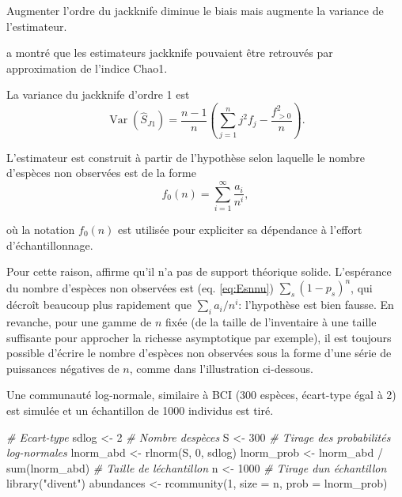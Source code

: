 \documentclass[
  11pt,
  american,
  a4paper,
  extrafontsizes,onecolumn,openright
  ]{memoir}
\newenvironment{Shaded}{\begin{snugshade}}{\end{snugshade}}
\newcommand{\AttributeTok}[1]{\textcolor[rgb]{0.77,0.63,0.00}{#1}}
\newcommand{\CommentTok}[1]{\textcolor[rgb]{0.56,0.35,0.01}{\textit{#1}}}
\newcommand{\DecValTok}[1]{\textcolor[rgb]{0.00,0.00,0.81}{#1}}
\newcommand{\FunctionTok}[1]{\textcolor[rgb]{0.00,0.00,0.00}{#1}}
\newcommand{\NormalTok}[1]{#1}
\newcommand{\OtherTok}[1]{\textcolor[rgb]{0.56,0.35,0.01}{#1}}
\newcommand{\SpecialCharTok}[1]{\textcolor[rgb]{0.00,0.00,0.00}{#1}}
\newcommand{\StringTok}[1]{\textcolor[rgb]{0.31,0.60,0.02}{#1}}
\begin{document}
Augmenter l'ordre du jackknife diminue le biais mais augmente la variance de l'estimateur.

\textcite{Chao1984} a montré que les estimateurs jackknife pouvaient être retrouvés par approximation de l'indice Chao1.

La variance du jackknife d'ordre 1 est \autocite{Heltshe1983}
\begin{equation} 
  \label{eq:VarJack1}
  \operatorname{Var}{\left( \hat{S}_\mathit{J1} \right)}
  = \frac{n - 1}{n} \left( \sum_{j = 1}^{n}{j^2 f_j} - \frac{f_{>0}^2}{n} \right).
\end{equation}

L'estimateur est construit à partir de l'hypothèse selon laquelle le nombre d'espèces non observées est de la forme
\[f_0(n) = \sum_{i = 1}^{\infty}{\frac{a_i}{n^i}},\]

où la notation \(f_0(n)\) est utilisée pour expliciter sa dépendance à l'effort d'échantillonnage.

Pour cette raison, \textcite{Cormack1989} affirme qu'il n'a pas de support théorique solide.
L'espérance du nombre d'espèces non observées est (eq. \eqref{eq:Esnnu}) \(\sum_s{(1 - p_s)^n}\), qui décroît beaucoup plus rapidement que \(\sum_{i}{{a_i}/{n^i}}\): l'hypothèse est bien fausse.
En revanche, pour une gamme de \(n\) fixée (de la taille de l'inventaire à une taille suffisante pour approcher la richesse asymptotique par exemple), il est toujours possible d'écrire le nombre d'espèces non observées sous la forme d'une série de puissances négatives de \(n\), comme dans l'illustration ci-dessous.

Une communauté log-normale, similaire à BCI (300 espèces, écart-type égal à 2) est simulée et un échantillon de 1000 individus est tiré.

\scriptsize

\begin{Shaded}
\begin{Highlighting}[]
\CommentTok{\# Ecart{-}type}
\NormalTok{sdlog }\OtherTok{\textless{}{-}} \DecValTok{2}
\CommentTok{\# Nombre d\textquotesingle{}espèces}
\NormalTok{S }\OtherTok{\textless{}{-}} \DecValTok{300}
\CommentTok{\# Tirage des probabilités log{-}normales}
\NormalTok{lnorm\_abd }\OtherTok{\textless{}{-}} \FunctionTok{rlnorm}\NormalTok{(S, }\DecValTok{0}\NormalTok{, sdlog)}
\NormalTok{lnorm\_prob }\OtherTok{\textless{}{-}}\NormalTok{ lnorm\_abd }\SpecialCharTok{/} \FunctionTok{sum}\NormalTok{(lnorm\_abd)}
\CommentTok{\# Taille de l\textquotesingle{}échantillon}
\NormalTok{n }\OtherTok{\textless{}{-}} \DecValTok{1000}
\CommentTok{\# Tirage d\textquotesingle{}un échantillon}
\FunctionTok{library}\NormalTok{(}\StringTok{"divent"}\NormalTok{)}
\NormalTok{abundances }\OtherTok{\textless{}{-}} \FunctionTok{rcommunity}\NormalTok{(}\DecValTok{1}\NormalTok{, }\AttributeTok{size =}\NormalTok{ n, }\AttributeTok{prob =}\NormalTok{ lnorm\_prob)}
\end{Highlighting}
\end{Shaded}
\end{document}
